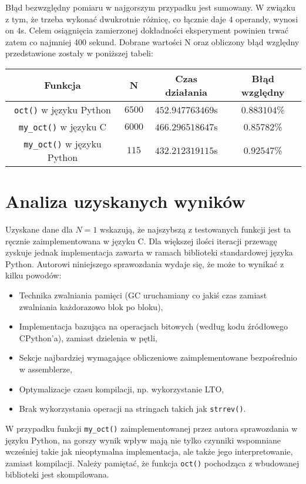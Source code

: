 \documentclass[11pt]{article}
\begin{document}
		Błąd bezwzględny pomiaru w najgorszym przypadku jest sumowany. W związku z tym, że trzeba wykonać dwukrotnie różnicę, co łącznie daje $4$ operandy, wynosi on $4$s.
		Celem osiągnięcia zamierzonej dokładności eksperyment powinien trwać zatem co najmniej 400 sekund. Dobrane wartości N oraz obliczony błąd względny przedstawione zostały w poniższej tabeli:
		
		\begin{table}[!h]
			\begin{tabular}{|c|c|c|c|}
				\hline
				\textbf{Funkcja} & \textbf{N} & \textbf{Czas działania} & \textbf{Błąd względny} \\
				\hline
				\texttt{oct()} w języku Python & $6500$ & $452.947763469$s & $0.883104$\% \\
				\hline
				\texttt{my\_oct()} w języku C & $6000$ & $466.296518647$s & $0.85782$\% \\
				\hline
				\texttt{my\_oct()} w języku Python & $115$ & $432.212319115$s & $0.92547$\% \\
				\hline
			\end{tabular}
		\end{table}
	
	\section{Analiza uzyskanych wyników}
	Uzyskane dane dla $N=1$ wskazują, że najszybszą z testowanych funkcji jest ta ręcznie zaimplementowana w języku C.
	Dla większej ilości iteracji przewagę zyskuje jednak implementacja zawarta w ramach biblioteki standardowej języka Python.
	Autorowi niniejszego sprawozdania wydaje się, że może to wynikać z kilku powodów:
	\begin{itemize}
		\item Technika zwalniania pamięci (GC uruchamiany co jakiś czas zamiast zwalniania każdorazowo blok po bloku),
		\item Implementacja bazująca na operacjach bitowych (według kodu źródłowego CPython'a), zamiast dzielenia w pętli,
		\item Sekcje najbardziej wymagające obliczeniowe zaimplementowane bezpośrednio w assemblerze,
		\item Optymalizacje czasu kompilacji, np. wykorzystanie LTO,
		\item Brak wykorzystania operacji na stringach takich jak \texttt{strrev()}.
	\end{itemize}

	W przypadku funkcji \texttt{my\_oct()} zaimplementowanej przez autora sprawozdania w języku Python, na gorszy wynik wpływ
	mają nie tylko czynniki wspomniane wcześniej takie jak nieoptymalna implementacja, ale także jego interpretowanie, zamiast kompilacji.
	Należy pamiętać, że funkcja \texttt{oct()} pochodząca z wbudowanej biblioteki jest skompilowana.
\end{document}
